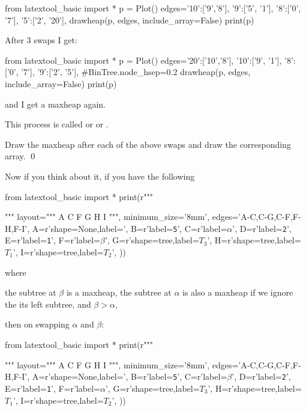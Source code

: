 \begin{python}
from latextool_basic import *
p = Plot()
edges={'10':['9','8'],
       '9':['5', '1'],
       '8':['0', '7'],
       '5':['2', '20'],
     }
drawheap(p, edges, include_array=False)
print(p)
\end{python}

After 3 swaps I get:

\begin{python}
from latextool_basic import *
p = Plot()
edges={'20':['10','8'],
       '10':['9', '1'],
       '8':['0', '7'],
       '9':['2', '5'],
     }
#BinTree.node_hsep=0.2
drawheap(p, edges, include_array=False)
print(p)
\end{python}

and I get a maxheap again.

This process is called
or
or
.

\begin{ex}
Draw the maxheap after each
of the above swaps and draw the corresponding array.
\qed
\end{ex}
  
Now if you think about it,
if you have the following
\begin{python}
from latextool_basic import *
print(r"""
\begin{center}
\end{center}
""" %
layout="""
   A 
     C
    F G
   H I
""",
minimum_size='8mm',
edges='A-C,C-G,C-F,F-H,F-I',
A=r'shape=None,label=\texttt{}',
B=r'label=\texttt{5}',
C=r'label=$\alpha$',
D=r'label=\texttt{2}',
E=r'label=\texttt{1}',
F=r'label=$\beta$',
G=r'shape=tree,label=$T_3$',
H=r'shape=tree,label=$T_1$',
I=r'shape=tree,label=$T_2$',
))
\end{python}

where 
\begin{tightlist}
\li the subtree at $\beta$ is a maxheap,
\li the subtree at $\alpha$ is also a maxheap if we ignore the 
its left subtree, 
\li and $\beta > \alpha$, 
\end{tightlist}
then
on swapping $\alpha$ and $\beta$:
\begin{python}
from latextool_basic import *
print(r"""
\begin{center}
\end{center}
""" %
layout="""
   A 
     C
    F G
   H I
""",
minimum_size='8mm',
edges='A-C,C-G,C-F,F-H,F-I',
A=r'shape=None,label=\texttt{}',
B=r'label=\texttt{5}',
C=r'label=$\beta$',
D=r'label=\texttt{2}',
E=r'label=\texttt{1}',
F=r'label=$\alpha$',
G=r'shape=tree,label=$T_3$',
H=r'shape=tree,label=$T_1$',
I=r'shape=tree,label=$T_2$',
))
\end{python}

